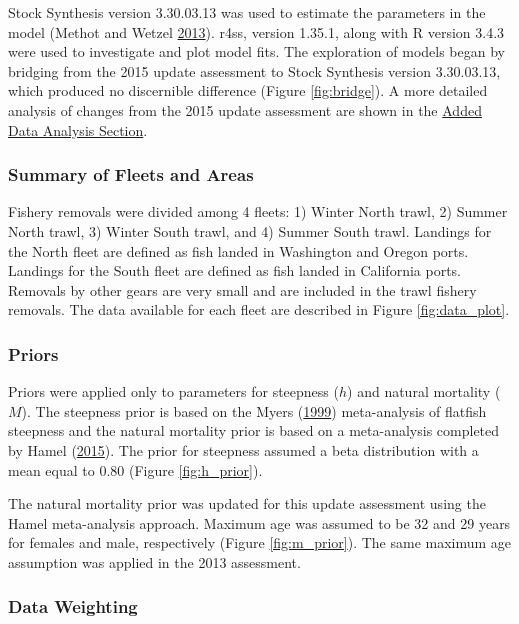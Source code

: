 \documentclass[12pt,]{article}
\begin{document}
Stock Synthesis version 3.30.03.13 was used to estimate the parameters
in the model (Methot and Wetzel
\protect\hyperlink{ref-methot_stock_2013}{2013}). r4ss, version 1.35.1,
along with R version 3.4.3 were used to investigate and plot model fits.
The exploration of models began by bridging from the 2015 update
assessment to Stock Synthesis version 3.30.03.13, which produced no
discernible difference (Figure \ref{fig:bridge}). A more detailed
analysis of changes from the 2015 update assessment are shown in the
\protect\hyperlink{added_data}{Added Data Analysis Section}.

\subsubsection{Summary of Fleets and
Areas}\label{summary-of-fleets-and-areas}

Fishery removals were divided among 4 fleets: 1) Winter North trawl, 2)
Summer North trawl, 3) Winter South trawl, and 4) Summer South trawl.
Landings for the North fleet are defined as fish landed in Washington
and Oregon ports. Landings for the South fleet are defined as fish
landed in California ports. Removals by other gears are very small and
are included in the trawl fishery removals. The data available for each
fleet are described in Figure \ref{fig:data_plot}.

\subsubsection{Priors}\label{priors}

Priors were applied only to parameters for steepness (\(h\)) and natural
mortality (\(M\)). The steepness prior is based on the Myers
(\protect\hyperlink{ref-myers_maximum_1999}{1999}) meta-analysis of
flatfish steepness and the natural mortality prior is based on a
meta-analysis completed by Hamel
(\protect\hyperlink{ref-hamel_method_2015}{2015}). The prior for
steepness assumed a beta distribution with a mean equal to 0.80 (Figure
\ref{fig:h_prior}).

The natural mortality prior was updated for this update assessment using
the Hamel meta-analysis approach. Maximum age was assumed to be 32 and
29 years for females and male, respectively (Figure \ref{fig:m_prior}).
The same maximum age assumption was applied in the 2013 assessment.

\subsubsection{Data Weighting}\label{data-weighting}
\end{document}
